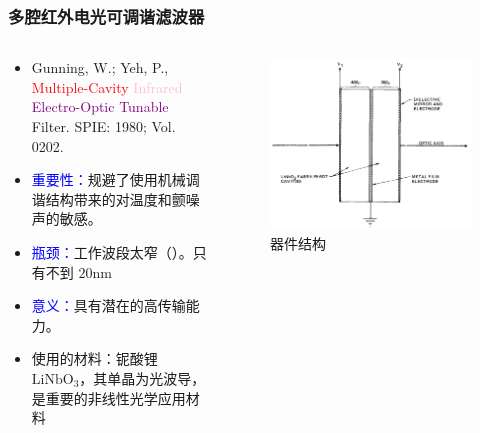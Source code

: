 \begin{frame}[c]
    \frametitle{多腔红外电光可调谐滤波器}
    \begin{columns}
        \begin{column}{.7\textwidth}
            \begin{itemize}
                \item Gunning, W.; Yeh, P., \textcolor{red}{Multiple-Cavity} \textcolor{pink}{Infrared} \textcolor{purple}{Electro-Optic Tunable} Filter. SPIE: 1980; Vol. 0202.
                \item \textcolor{blue}{重要性：}规避了使用机械调谐结构带来的对温度和颤噪声的敏感。
                \item \textcolor{blue}{瓶颈：}工作波段太窄（）。只有不到 $20 \mathrm{nm}$
                \item \textcolor{blue}{意义：}具有潜在的高传输能力。
                \item \footnotesize{使用的材料：铌酸锂 $\mathrm{LiNbO}_3$，其单晶为光波导，是重要的非线性光学应用材料}
            \end{itemize}
        \end{column}
        \begin{column}{.3\textwidth}
            \begin{figure}[H] %
                \centering %
                \includegraphics[width=1.\textwidth]{figures/Multiple-Cavity Infrared Electro-Optic Tunable Filter_2.png} %
                \caption{器件结构}
            \end{figure}
        \end{column}
    \end{columns}
\end{frame}

